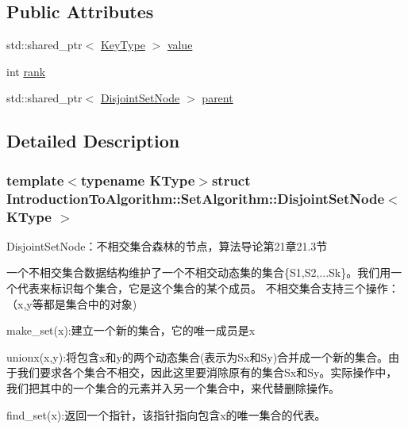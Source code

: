 \subsection*{Public Attributes}
\begin{DoxyCompactItemize}
\item 
std\+::shared\+\_\+ptr$<$ \hyperlink{struct_introduction_to_algorithm_1_1_set_algorithm_1_1_disjoint_set_node_a8f801679de129d80a99ad683430c534a}{Key\+Type} $>$ \hyperlink{struct_introduction_to_algorithm_1_1_set_algorithm_1_1_disjoint_set_node_a03e58ee7a2d6949283fafcd1de53e53b}{value}
\item 
int \hyperlink{struct_introduction_to_algorithm_1_1_set_algorithm_1_1_disjoint_set_node_a1fd137f74ca1317bfb02d9e1640ce147}{rank}
\item 
std\+::shared\+\_\+ptr$<$ \hyperlink{struct_introduction_to_algorithm_1_1_set_algorithm_1_1_disjoint_set_node}{Disjoint\+Set\+Node} $>$ \hyperlink{struct_introduction_to_algorithm_1_1_set_algorithm_1_1_disjoint_set_node_ad5cf3f4d739ecd0c1f6d3b3005e21993}{parent}
\end{DoxyCompactItemize}


\subsection{Detailed Description}
\subsubsection*{template$<$typename K\+Type$>$struct Introduction\+To\+Algorithm\+::\+Set\+Algorithm\+::\+Disjoint\+Set\+Node$<$ K\+Type $>$}

Disjoint\+Set\+Node：不相交集合森林的节点，算法导论第21章21.3节 

一个不相交集合数据结构维护了一个不相交动态集的集合\{S1,S2,...Sk\}。我们用一个代表来标识每个集合，它是这个集合的某个成员。 不相交集合支持三个操作：（x,y等都是集合中的对象)


\begin{DoxyItemize}
\item make\+\_\+set(x)\+:建立一个新的集合，它的唯一成员是x
\item unionx(x,y)\+:将包含x和y的两个动态集合(表示为\+Sx和\+Sy)合并成一个新的集合。由于我们要求各个集合不相交，因此这里要消除原有的集合\+Sx和\+Sy。实际操作中， 我们把其中的一个集合的元素并入另一个集合中，来代替删除操作。
\item find\+\_\+set(x)\+:返回一个指针，该指针指向包含x的唯一集合的代表。
\end{DoxyItemize}

